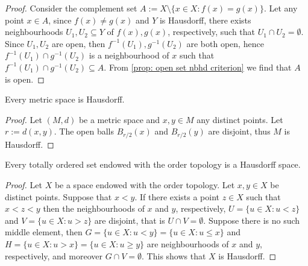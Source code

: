 \begin{proof}
  Consider the complement set \(A := X \setminus \{x \in X : f(x) = g(x)\}\).
  Let any point \(x \in A\), since \(f(x) \neq g(x)\) and \(Y\) is Hausdorff,
  there exists neighbourhoods \(U_1, U_2 \subseteq Y\) of \(f(x), g(x)\),
  respectively, such that \(U_1 \cap U_2 = \emptyset\). Since \(U_1, U_2\) are
  open, then \(f^{-1}(U_1), g^{-1}(U_2)\) are both open, hence \(f^{-1}(U_1)
  \cap g^{-1}(U_2)\) is a neighbourhood of \(x\) such that \(f^{-1}(U_1) \cap
  g^{-1}(U_2) \subseteq A\). From \cref{prop: open set nbhd criterion} we find
  that \(A\) is open.
\end{proof}

\begin{proposition}\label{prop: metric space T2}
  Every metric space is Hausdorff.
\end{proposition}

\begin{proof}
  Let \((M, d)\) be a metric space and \(x, y \in M\) any distinct points. Let
  \(r := d(x, y)\). The open balls \(B_{r/2}(x)\) and \(B_{r/2}(y)\) are
  disjoint, thus \(M\) is Hausdorff.
\end{proof}

\begin{proposition}\label{prop: order top implies T2}
  Every totally ordered set endowed with the order topology is a Hausdorff
  space.
\end{proposition}

\begin{proof}
  Let \(X\) be a space endowed with the order topology. Let \(x, y \in X\) be
  distinct points. Suppose that \(x < y\). If there exists a point \(z \in X\)
  such that  \(x < z < y\) then the neighbourhoods of \(x\) and \(y\),
  respectively, \(U = \{u \in X : u < z\}\) and \(V = \{u \in X : u > z\}\) are
  disjoint, that is \(U \cap V = \emptyset\). Suppose there is no such middle
  element, then \(G = \{u \in X : u < y\} = \{u \in X : u \leq x\}\) and \(H =
  \{u \in X : u > x\} = \{u \in X : u \geq y\}\) are neighbourhoods of \(x\) and
  \(y\), respectively, and moreover \(G \cap V = \emptyset\). This shows that
  \(X\) is Hausdorff.
\end{proof}
